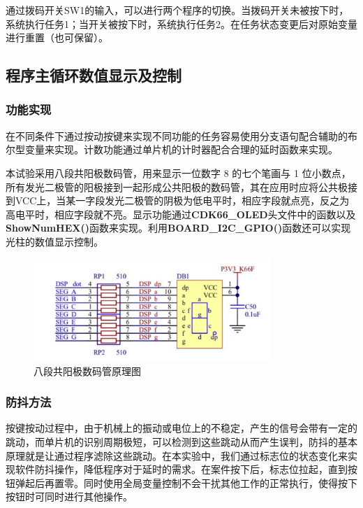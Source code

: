 \documentclass[12pt]{article}
\begin{document}
通过拨码开关SW1的输入，可以进行两个程序的切换。当拨码开关未被按下时，系统执行任务1；当开关被按下时，系统执行任务2。在任务状态变更后对原始变量进行重置（也可保留）。

\subsection{程序主循环数值显示及控制}

\subsubsection{功能实现}

在不同条件下通过按动按键来实现不同功能的任务容易使用分支语句配合辅助的布尔型变量来实现。计数功能通过单片机的计时器配合合理的延时函数来实现。

本试验采用八段共阳极数码管，用来显示一位数字 8 的七个笔画与 1 位小数点，所有发光二极管的阳极接到一起形成公共阳极的数码管，其在应用时应将公共极接到VCC上，当某一字段发光二极管的阴极为低电平时，相应字段就点亮，反之为高电平时，相应字段就不亮。显示功能通过\textbf{CDK66\_OLED}头文件中的函数以及\textbf{ShowNumHEX()}函数来实现。利用\textbf{BOARD\_I2C\_GPIO()}函数还可以实现光柱的数值显示控制。

\begin{figure}[htbp]
	\centering
	\includegraphics[width = 0.8\textwidth]{graph/pic1.png}
	\caption{八段共阳极数码管原理图}
\end{figure}

\subsubsection{防抖方法}

按键按动过程中，由于机械上的振动或电位上的不稳定，产生的信号会带有一定的跳动，而单片机的识别周期极短，可以检测到这些跳动从而产生误判，防抖的基本原理就是让通过程序滤除这些跳动。在本实验中，我们通过标志位的状态变化来实现软件防抖操作，降低程序对于延时的需求。在案件按下后，标志位拉起，直到按钮弹起后再置零。同时使用全局变量控制不会干扰其他工作的正常执行，使得按下按钮时可同时进行其他操作。
\end{document}
